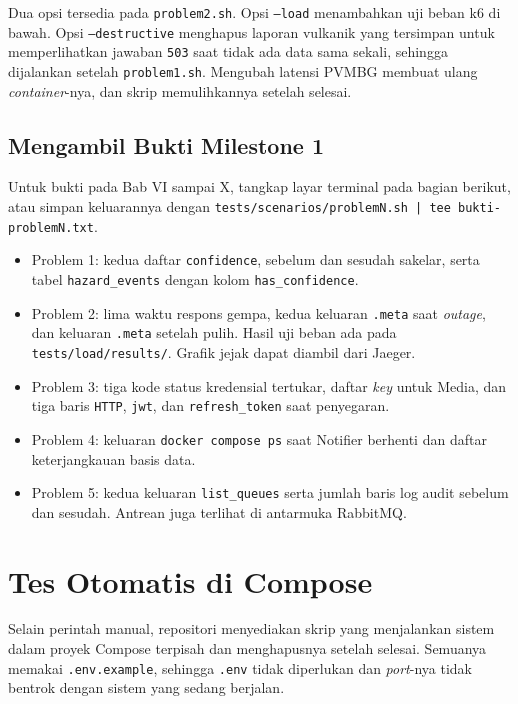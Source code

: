 Dua opsi tersedia pada \texttt{problem2.sh}. Opsi \texttt{--load} menambahkan uji beban k6 di bawah. Opsi \texttt{--destructive} menghapus laporan vulkanik yang tersimpan untuk memperlihatkan jawaban \texttt{503} saat tidak ada data sama sekali, sehingga dijalankan setelah \texttt{problem1.sh}. Mengubah latensi PVMBG membuat ulang \textit{container}-nya, dan skrip memulihkannya setelah selesai.

\subsection{Mengambil Bukti Milestone 1}

Untuk bukti pada Bab VI sampai X, tangkap layar terminal pada bagian berikut, atau simpan keluarannya dengan \texttt{tests/scenarios/problemN.sh | tee bukti-problemN.txt}.

\begin{itemize}
\item Problem 1: kedua daftar \texttt{confidence}, sebelum dan sesudah sakelar, serta tabel \texttt{hazard\_events} dengan kolom \texttt{has\_confidence}.
\item Problem 2: lima waktu respons gempa, kedua keluaran \texttt{.meta} saat \textit{outage}, dan keluaran \texttt{.meta} setelah pulih. Hasil uji beban ada pada \texttt{tests/load/results/}. Grafik jejak dapat diambil dari Jaeger.
\item Problem 3: tiga kode status kredensial tertukar, daftar \textit{key} untuk Media, dan tiga baris \texttt{HTTP}, \texttt{jwt}, dan \texttt{refresh\_token} saat penyegaran.
\item Problem 4: keluaran \texttt{docker compose ps} saat Notifier berhenti dan daftar keterjangkauan basis data.
\item Problem 5: kedua keluaran \texttt{list\_queues} serta jumlah baris log audit sebelum dan sesudah. Antrean juga terlihat di antarmuka RabbitMQ.
\end{itemize}

\section{Tes Otomatis di Compose}

Selain perintah manual, repositori menyediakan skrip yang menjalankan sistem dalam proyek Compose terpisah dan menghapusnya setelah selesai. Semuanya memakai \texttt{.env.example}, sehingga \texttt{.env} tidak diperlukan dan \textit{port}-nya tidak bentrok dengan sistem yang sedang berjalan.

